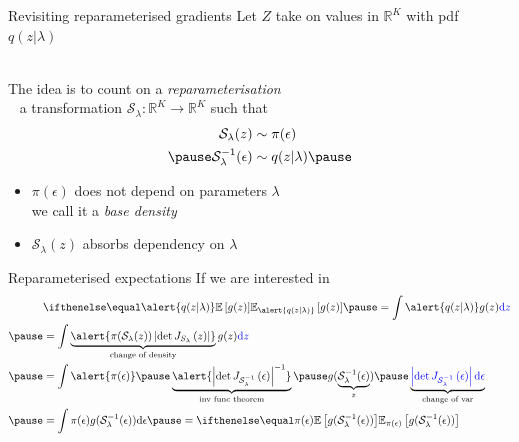 \documentclass[14pt,dvipsnames]{beamer}
\begin{document}
\begin{frame}{Revisiting reparameterised gradients}
	Let $Z$ take on values in $\mathbb R^K$ with pdf $q(z|\lambda)$ \\
	
	~ \pause

	The idea is to count on a \emph{reparameterisation} \\ \pause
	~ a transformation $\mathcal S_\lambda: \mathbb R^K \to \mathbb R^K$ such that \pause
	\begin{equation*}
	\begin{aligned}
	\mathcal S_\lambda(z) &\sim \pi(\epsilon) \\ \pause
 	\inv{\mathcal S}_\lambda(\epsilon) &\sim q(z|\lambda) \pause
	\end{aligned}
	\end{equation*} 
	\begin{itemize}
		\item $\pi(\epsilon)$ does not depend on parameters $\lambda$\\
		we call it a \emph{base density} \pause
		\item $\mathcal S_\lambda(z)$ absorbs dependency on $\lambda$ 
	\end{itemize}

\end{frame}

\begin{frame}{Reparameterised expectations}
	If we are interested in 
	\begin{equation*}
	\begin{aligned}
		&  \E[\alert{q(z|\lambda)}]{g(z)} \pause = \int \alert{q(z|\lambda)} g(z) \textcolor{blue}{\dd z} \\ \pause
		&= \int \underbrace{\alert{\pi(\mathcal S_\lambda(z)) \djac{S_\lambda}{z}}}_{\text{change of density}} g(z) \textcolor{blue}{\dd z} \\ \pause
		&= \int \alert{\pi(\epsilon)} \pause \underbrace{\alert{\djac{\inv{\mathcal S}_\lambda}{\epsilon}^{-1}}}_{\text{inv func theorem}} \pause g(\underbrace{\inv{\mathcal S}_\lambda(\epsilon)}_{z}) \pause \underbrace{\textcolor{blue}{\djac{\inv{\mathcal S}_\lambda}{\epsilon} \dd \epsilon}}_{\text{change of var}} \\ \pause
		&= \int \pi(\epsilon) g(\inv{\mathcal S}_\lambda(\epsilon))\dd \epsilon \pause = \E[\pi(\epsilon)]{g(\inv{\mathcal S}_\lambda(\epsilon)) }
	\end{aligned}
	\end{equation*}
\end{frame}
\end{document}
